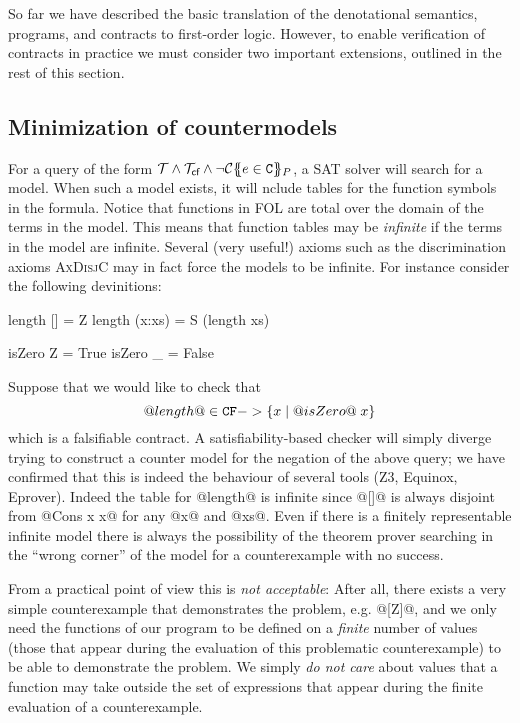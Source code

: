 So far we have described the basic translation of the denotational semantics, programs, and contracts
to first-order logic. However, to enable verification of contracts in practice we must consider two 
important extensions, outlined in the rest of this section.

\subsection{Minimization of countermodels}\label{sect:minimization}

For a query of the form $\Th \land \Th_\lcfZ \land \neg \ctrans{}{P}{e \in \Ct}$, a SAT solver will search for
a model. When such a model exists, it will nclude tables for the function symbols in the formula. Notice that functions 
in FOL are total over the domain of the terms in the model. This means that function tables may be {\em infinite} if the 
terms in the model are infinite. Several (very useful!) axioms such as the discrimination axioms \textsc{AxDisjC} may in 
fact force the models to be infinite. For instance consider the following devinitions:
\begin{code}
length [] = Z
length (x:xs) = S (length xs)

isZero Z = True
isZero _ = False
\end{code}
Suppose that we would like to check that 
   \[ @length@ \in \CF -> \{ x \mid @isZero@\;x\} \]
which is a falsifiable contract.  A satisfiability-based checker 
will simply diverge trying to construct a counter model for the negation of the above query; we 
have confirmed that this is indeed the behaviour of several tools (Z3, Equinox, Eprover).
Indeed the table for @length@ is infinite since @[]@ is always disjoint from @Cons x x@ for 
any @x@ and @xs@. Even if there is a finitely representable infinite model there is always the 
possibility of the theorem prover searching in the ``wrong corner'' of the model for a 
counterexample with no success. 

From a practical point of view this is {\em not acceptable}: After all, there exists a very simple 
counterexample that demonstrates the problem, e.g. @[Z]@, and we only need the 
functions of our program to be defined on a {\em finite} number of values (those that appear 
during the evaluation of this problematic counterexample) to be able to demonstrate 
the problem. We simply {\em do not care} about values that a function may take outside 
the set of expressions that appear during the finite evaluation of a counterexample.


